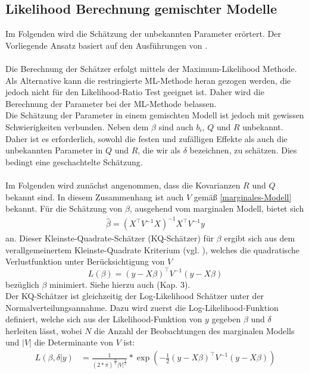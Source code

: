 \documentclass[%
thesis=student,%
coverpage=false,%
titlepage=false,%
headmarks=true, %
german,%
font=libertine, %
math=newpxtx, %
BCOR=5mm,%
coverBCOR=11mm%
]{tumbook}
\theoremstyle{break}
\begin{document}
\subsection{Likelihood Berechnung gemischter Modelle}
Im Folgenden wird die Schätzung der unbekannten Parameter erörtert. Der Vorliegende Ansatz basiert auf den Ausführungen von \cite{fahrmeir-2011-regression}.\\
\\
Die Berechnung der Schätzer erfolgt mittels der Maximum-Likelihood Methode. Als Alternative kann die restringierte ML-Methode heran gezogen werden, die jedoch nicht für den Likelihood-Ratio Test geeignet ist. Daher wird die Berechnung der Parameter bei der ML-Methode belassen.\\
Die Schätzung der Parameter in einem gemischten Modell ist jedoch mit gewissen Schwierigkeiten verbunden. Neben dem $\beta$ sind auch $b_i$, $Q$ und $R$ unbekannt. Daher ist es erforderlich, sowohl die festen und zufälligen Effekte als auch die unbekannten Parameter in $Q$ und $R$, die wir als $\delta$ bezeichnen, zu schätzen. Dies bedingt eine geschachtelte Schätzung.\\
\\
Im Folgenden wird zunächst angenommen, dass die Kovarianzen $R$ und  $Q$ bekannt sind. In diesem Zusammenhang ist auch $V$ gemäß \ref{marginales-Modell} bekannt. Für die Schätzung von $\beta$, ausgehend vom marginalen Modell, bietet sich 
\begin{align}
	\hat{\beta} = (X^{\top} V^{-1}X)^{-1}X^{\top} V^{-1}y \label{KQ-Schätzerfürbeta}
\end{align} an.
Dieser Kleinste-Quadrate-Schätzer (KQ-Schätzer) für $\beta$ ergibt sich aus dem verallgemeinertem Kleinste-Quadrate Kriterium (vgl. \cite{KQ-Schätzer}), welches die quadratische Verlustfunktion unter Berücksichtigung von $V$
$$L(\beta) = (y-X\beta)^{\top}V^{-1}(y-X\beta)$$ 
bezüglich $\beta$ minimiert. Siehe hierzu auch \cite{fahrmeir-2011-regression} (Kap. 3).\\
Der KQ-Schätzer ist gleichzeitig der Log-Likelihood Schätzer unter der Normalverteilungsannahme. Dazu wird zuerst die Log-Likelihood-Funktion definiert, welche sich aus der Likelihood-Funktion von $y$ gegeben $\beta$ und $\delta$ herleiten lässt, wobei $N$ die Anzahl der Beobachtungen des marginalen Modells und $|V|$ die Determinante von $V$ ist:
\begin{align}
	L(\beta,\delta|y) &= \frac{1}{(2*\pi)^{\frac{N}{2}}|V|^{\frac{1}{2}}} * \exp (-\frac{1}{2}(y-X\beta)^{\top} V^{-1} (y-X\beta)) \\
\end{align}
\end{document}
